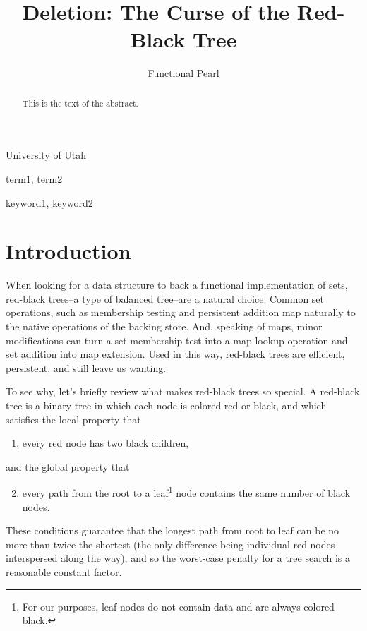 \documentclass[preprint]{sigplanconf}
\begin{document}
\copyrightdata{[to be supplied]} 


\title{Deletion: The Curse of the Red-Black Tree}
\subtitle{Functional Pearl}

           {University of Utah}

\maketitle

\begin{abstract}
This is the text of the abstract.
\end{abstract}


\terms
term1, term2

\keywords
keyword1, keyword2

\section{Introduction}

When looking for a data structure to back a functional implementation of sets, red-black trees--a type of balanced tree--are a natural choice. Common set operations, such as membership testing and persistent addition map naturally to the native operations of the backing store. And, speaking of maps, minor modifications can turn a set membership test into a map lookup operation and set addition into map extension. Used in this way, red-black trees are efficient, persistent, and still leave us wanting.

To see why, let's briefly review what makes red-black trees so special. A red-black tree is a binary tree in which each node is colored red or black, and which satisfies the local property that
\begin{enumerate}
\item every red node has two black children,
\end{enumerate}
and the global property that
\begin{enumerate}
\setcounter{enumi}{1}
\item every path from the root to a leaf\footnote{For our purposes, leaf nodes do not contain data and are always colored black.} node contains the same number of black nodes.
\end{enumerate}
These conditions guarantee that the longest path from root to leaf can be no more than twice the shortest (the only difference being individual red nodes interspersed along the way), and so the worst-case penalty for a tree search is a reasonable constant factor.
\end{document}
